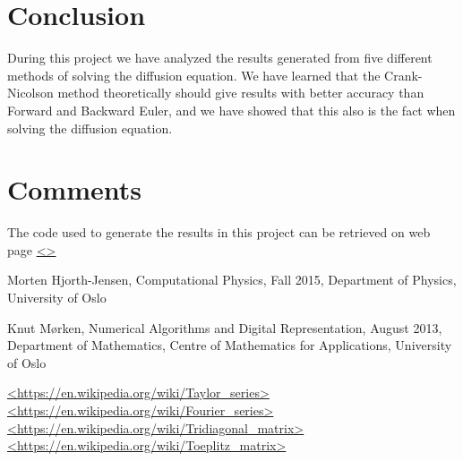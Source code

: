 \documentclass[12pt]{article}
\begin{document}
\begin{flushleft}
\newpage
\section{Conclusion}
During this project we have analyzed the results generated from five different methods of solving the diffusion equation. We have learned that the Crank-Nicolson method theoretically should give results with better accuracy than Forward and Backward Euler, and we have showed that this also is the fact when solving the diffusion equation. 
\section{Comments}
The code used to generate the results in this project can be retrieved on web page \url{<>}\\

\begin{thebibliography}{9}
Morten Hjorth-Jensen, Computational Physics, Fall 2015, Department of Physics, University of Oslo

Knut Mørken, Numerical Algorithms and Digital Representation, August 2013, Department of Mathematics, Centre of Mathematics for Applications, University of Oslo

\url{<https://en.wikipedia.org/wiki/Taylor_series>}\\

\url{<https://en.wikipedia.org/wiki/Fourier_series>}\\

\url{<https://en.wikipedia.org/wiki/Tridiagonal_matrix>}\\

\url{<https://en.wikipedia.org/wiki/Toeplitz_matrix>}\\

\end{thebibliography}
\end{flushleft}
\end{document}
